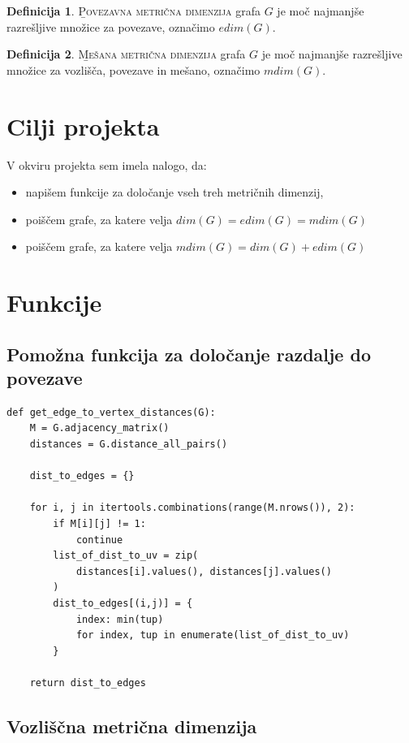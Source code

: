 \documentclass[a4paper,12pt]{article}
\theoremstyle{definition}
\newtheorem{definicija}{Definicija}[section]
\theoremstyle{remark}
\theoremstyle{definition}
\begin{document}
\begin{definicija}
    \textsc\b{Povezavna metrična dimenzija} grafa $G$ je moč najmanjše
    razrešljive množice za povezave, označimo $edim(G)$.
\end{definicija}

\begin{definicija}
    \textsc\b{Mešana metrična dimenzija} grafa $G$ je moč najmanjše
    razrešljive množice za vozlišča, povezave in mešano, označimo $mdim(G)$.
\end{definicija}

\section*{Cilji projekta}

V okviru projekta sem imela nalogo, da:
\begin{itemize}
    \item napišem funkcije za določanje vseh treh metričnih dimenzij,
    \item poiščem grafe, za katere velja $dim(G)=edim(G)=mdim(G)$
    \item poiščem grafe, za katere velja $mdim(G)=dim(G)+edim(G)$
\end{itemize}

\newpage
\section*{Funkcije}

\subsection*{Pomožna funkcija za določanje razdalje do povezave}
\begin{lstlisting}
def get_edge_to_vertex_distances(G):
    M = G.adjacency_matrix()
    distances = G.distance_all_pairs()

    dist_to_edges = {}

    for i, j in itertools.combinations(range(M.nrows()), 2):
        if M[i][j] != 1:
            continue
        list_of_dist_to_uv = zip(
            distances[i].values(), distances[j].values()
        )
        dist_to_edges[(i,j)] = {
            index: min(tup) 
            for index, tup in enumerate(list_of_dist_to_uv)
        }

    return dist_to_edges
\end{lstlisting}


\subsection*{Vozliščna metrična dimenzija}
\end{document}
